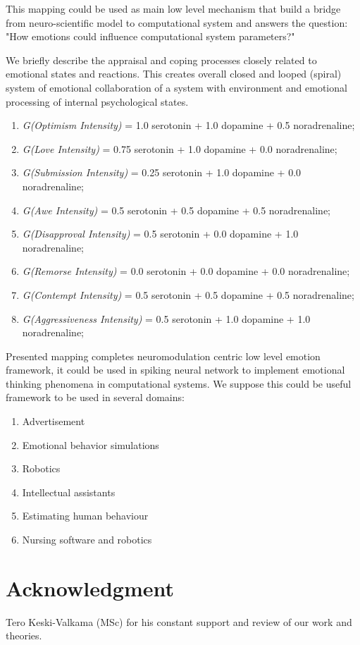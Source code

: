 This mapping could be used as main low level mechanism that build a bridge from neuro-scientific model to computational system and answers the question: "How emotions could influence computational system parameters?"

We briefly describe the appraisal and coping processes closely related to emotional states and reactions. This creates overall closed and looped (spiral) system of emotional collaboration of a system with environment and emotional processing of internal psychological states.

\begin{enumerate}
 \item  \emph{G(Optimism Intensity)} = 1.0 serotonin  + 1.0 dopamine + 0.5 noradrenaline;
 \item  \emph{G(Love Intensity)} = 0.75 serotonin + 1.0 dopamine + 0.0 noradrenaline;
 \item  \emph{G(Submission Intensity)} = 0.25 serotonin + 1.0 dopamine + 0.0 noradrenaline;
 \item  \emph{G(Awe Intensity)} = 0.5 serotonin + 0.5 dopamine + 0.5 noradrenaline;
 \item  \emph{G(Disapproval Intensity)} = 0.5 serotonin + 0.0 dopamine + 1.0 noradrenaline;
 \item  \emph{G(Remorse Intensity)} = 0.0 serotonin + 0.0 dopamine + 0.0 noradrenaline;
 \item  \emph{G(Contempt Intensity)} = 0.5 serotonin + 0.5 dopamine + 0.5 noradrenaline;
 \item  \emph{G(Aggressiveness Intensity)} = 0.5 serotonin + 1.0 dopamine + 1.0 noradrenaline;
\end{enumerate}

Presented mapping completes neuromodulation centric low level emotion framework, it could be used in spiking neural network to implement emotional thinking phenomena in computational systems. We suppose this could be useful framework to be used in several domains:

\begin{enumerate}
 \item  Advertisement
 \item  Emotional behavior simulations
 \item  Robotics
 \item  Intellectual assistants
 \item  Estimating human behaviour
 \item  Nursing software and robotics
\end{enumerate}

\section{Acknowledgment}

Tero Keski-Valkama (MSc) for his constant support and review of our work and theories.
